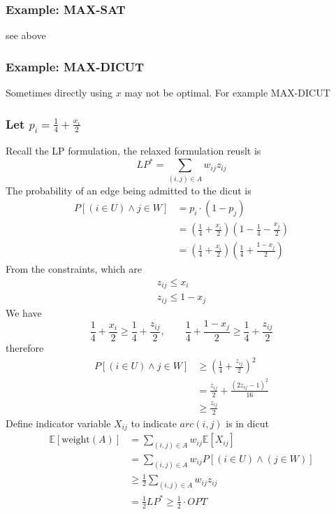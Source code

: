 \documentclass[10pt]{article}
\theoremstyle{definition}
\begin{document}
\subsubsection*{Example: MAX-SAT}
see above 
\subsubsection*{Example: MAX-DICUT}
Sometimes directly using $x$ may not be optimal. For example MAX-DICUT

\subsubsection*{Let $p_i = \frac{1}{4} + \frac{x_i}{2}$}
Recall the LP formulation, the relaxed formulation reuslt is 
\[LP^* = \sum_{(i, j) \in A} w_{ij}z_{ij}\]
The probability of an edge being admitted to the dicut is 
\begin{align*}
P[(i \in U) \land j \in W] &= p_i \cdot (1 - p_j)  \\
&= (\frac{1}{4} + \frac{x_i}{2})(1 - \frac{1}{4} - \frac{x_j}{2})\\
&= (\frac{1}{4} + \frac{x_i}{2})(\frac{1}{4} + \frac{1 - x_j}{2}) 
\end{align*}
From the constraints, which are 
\begin{align*}
  z_{ij} \leq x_i\\
  z_{ij} \leq 1 - x_j
\end{align*}
We have 
\[\frac{1}{4} + \frac{x_i}{2} \geq \frac{1}{4} + \frac{z_{ij}}{2}, \quad\quad \frac{1}{4} + \frac{1-x_j}{2} \geq \frac{1}{4} + \frac{z_{ij}}{2} \]
therefore 
\begin{align*}
P[(i \in U) \land j \in W] &\geq \left(\frac{1}{4} + \frac{z_{ij}}{2} \right)^2  \\
&=\frac{z_{ij}}{2} + \frac{(2z_{ij} -1)^2}{16}\\
&\geq \frac{z_{ij}}{2}
\end{align*}
Define indicator variable $X_{ij}$ to indicate $arc(i, j)$ is in dicut
\begin{align*}
  \mathbb{E}[\text{weight}(A)] &= \sum_{(i, j) \in A} w_{ij} \mathbb{E}[X_{ij}]\\
  &= \sum_{(i,j) \in A} w_{ij} P[(i \in U) \land (j \in W)]\\
  &\geq \frac{1}{2} \sum_{(i,j) \in A} w_{ij} z_{ij}\\
  & = \frac{1}{2} LP^* \geq \frac{1}{2} \cdot OPT
\end{align*}
\end{document}

